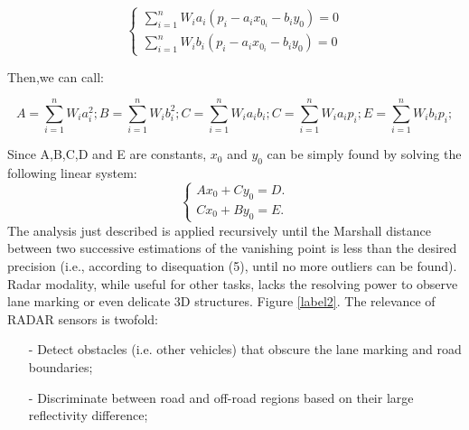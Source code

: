 \documentclass[12pt]{article}
\begin{document}
\begin{equation}\label{sum}
 \begin{cases}
  \sum\limits^n_{i=1} W_i a_i (p_i-a_i x_0_i - b_i y_0) = 0 \\
  \sum\limits^n_{i=1} W_i b_i (p_i-a_i x_0_i - b_i y_0) = 0 
\end{cases}
\end{equation}
\newline
\raggedright Then,we can call:
\noindent


\begin{equation}\label{sum1}
A= \sum^n_{i=1} W_i a_i^2; B=\sum^n_{i=1} W_i b_i^2;C=\sum^n_{i=1} W_i a_i b_i ;C=\sum^n_{i=1} W_i a_i p_i ;E=\sum^n_{i=1} W_i b_ip_i;
\end{equation}
\raggedright Since A,B,C,D and E are constants, $x_0$ and $y_0$ can be simply found by solving the following linear system:
$$\begin{cases}
Ax_0+Cy_0=D.\\
Cx_0+By_0=E.
\end{cases}$$
The analysis just described is applied recursively until the Marshall distance between two successive estimations of the vanishing point is less than the desired precision (i.e., according to disequation (5\label{sum1}), until no more outliers can be found). Radar modality, while useful for other tasks, lacks the resolving power to observe lane marking or even delicate 3D structures. Figure \ref{label2}. The relevance of RADAR sensors is twofold:
\begin{itemize}
    \item[-] Detect obstacles (i.e. other vehicles) that obscure the lane marking and road boundaries;
    \item[-] Discriminate between road and off-road regions based on their large reflectivity difference;
\end{itemize}
\end{document}
